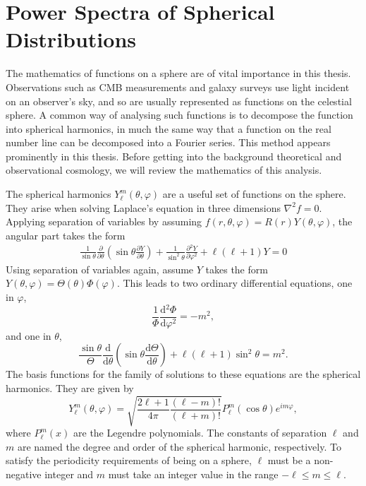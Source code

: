 \documentclass[a4paper,12pt]{report}
\newcommand{\deriv}[2]{\frac{\text{d}{#1}}{\text{d}{#2}}}
\newcommand{\pderiv}[2]{\frac{\partial{#1}}{\partial{#2}}}
\begin{document}
\section{Power Spectra of Spherical Distributions}\label{section: power spectra introduction}
The mathematics of functions on a sphere are of vital importance in this thesis. Observations such as CMB measurements and galaxy surveys use light incident on an observer's sky, and so are usually represented as functions on the celestial sphere. A common way of analysing such functions is to decompose the function into spherical harmonics, in much the same way that a function on the real number line can be decomposed into a Fourier series. This method appears prominently in this thesis. Before getting into the background theoretical and observational cosmology, we will review the mathematics of this analysis.

The spherical harmonics $Y^m_\ell (\theta, \varphi)$ are a useful set of functions on the sphere. They arise when solving Laplace's equation in three dimensions $\nabla^2f=0$. Applying separation of variables by assuming $f(r,\theta,\varphi) = R(r)Y(\theta,\varphi)$, the angular part takes the form
\begin{align}
  \frac{1}{\sin\theta}\pderiv{}{\theta}\left(\sin\theta\pderiv{Y}{\theta}\right)
  + \frac{1}{\sin^2\theta}\pderiv{^2Y}{\varphi^2} + \ell(\ell+1)Y = 0
\end{align}
Using separation of variables again, assume $Y$ takes the form $Y(\theta,\varphi) = \Theta(\theta)\Phi(\varphi)$. This leads to two ordinary differential equations, one in $\varphi$,
\begin{equation}
  \frac{1}{\Phi}\deriv{^2\Phi}{\varphi^2} = -m^2,
\end{equation}
and one in $\theta$,
\begin{equation}
  \frac{\sin\theta}{\Theta}\deriv{}{\theta}\left(\sin\theta\deriv{\Theta}{\theta}\right) + \ell(\ell+1)\sin^2\theta = m^2.
\end{equation}
The basis functions for the family of solutions to these equations are the spherical harmonics. They are given by
\begin{equation} \label{eqn: spherical harmonics}
  Y^m_\ell(\theta,\varphi) = \sqrt{\frac{2\ell+1}{4\pi}\frac{(\ell-m)!}{(\ell+m)!}}P^m_\ell(\cos\theta)e^{im\varphi},
\end{equation}
where $P^m_\ell(x)$ are the Legendre polynomials. The constants of separation $\ell$ and $m$ are named the degree and order of the spherical harmonic, respectively. To satisfy the periodicity requirements of being on a sphere, $\ell$ must be a non-negative integer and $m$ must take an integer value in the range $-\ell \leq m \leq \ell$.
\end{document}
